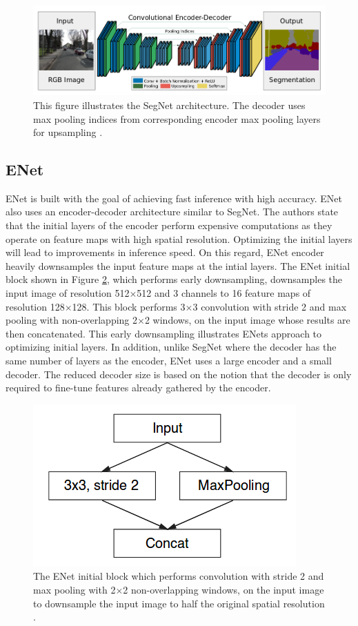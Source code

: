 	\begin{figure}[h]
		\centering
		\includegraphics[width=1\linewidth]{images/segnet}
		\caption{This figure illustrates the SegNet architecture. The decoder uses max pooling indices from corresponding encoder max pooling layers for upsampling \cite{DBLP:journals/corr/BadrinarayananK15}.}
		\label{Fig:segnet}
	\end{figure}

\subsection{ENet}

ENet \cite{DBLP:journals/corr/PaszkeCKC16} is built with the goal of achieving fast inference with high accuracy. ENet also uses an encoder-decoder architecture similar to SegNet. The authors state that the initial layers of the encoder perform expensive computations as they operate on feature maps with high spatial resolution. Optimizing the initial layers will lead to improvements in inference speed. On this regard, ENet encoder heavily downsamples the input feature maps at the intial layers. The ENet initial block shown in Figure \ref{Fig:enet}, which performs early downsampling, downsamples the input image of resolution 512$\times$512 and 3 channels to 16 feature maps of resolution 128$\times$128. This block performs 3$\times$3 convolution with stride 2 and max pooling with non-overlapping 2$\times$2 windows, on the input image whose results are then concatenated. This early downsampling illustrates ENets approach to optimizing initial layers. In addition, unlike SegNet where the decoder has the same number of layers as the encoder, ENet uses a large encoder and a small decoder. The reduced decoder size is based on the notion that the decoder is only required to fine-tune features already gathered by the encoder. 

	\begin{figure}[h]
		\centering
		\includegraphics[width=.4\linewidth]{images/enet}
		\caption{The ENet initial block which performs convolution with stride 2 and max pooling with 2$\times$2 non-overlapping windows, on the input image to downsample the input image to half the original spatial resolution \cite{DBLP:journals/corr/PaszkeCKC16}.}
		\label{Fig:enet}
	\end{figure}

